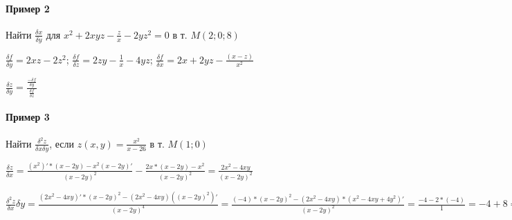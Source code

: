 \documentclass{article}
\begin{document}
\begin{flushleft}
\paragraph{Пример 2}

\hfill

\hfill

Найти $\frac{\delta x}{\delta y}$ для $x^2 + 2xyz - \frac{z}{x} - 2yz^2 = 0$ в т. $M(2; 0; 8)$

$\frac{\delta f}{\delta y} = 2xz - 2z^2$; $\frac{\delta f}{\delta z} = 2zy - \frac{1}{x} - 4yz$; $\frac{\delta f}{\delta x} = 2x + 2yz - \frac{(x - z)}{x^2}$

$\frac{\delta z}{\delta y} = \frac{\frac{- \delta f}{\delta y}}{\frac{\delta f}{\delta z}}$


\paragraph{Пример 3}

\hfill

\hfill

Найти $\frac{\delta^2 z}{\delta x \delta y}$, если $z(x, y) = \frac{x^2}{x - 26}$ в т. $M(1; 0)$

$\frac{\delta z}{\delta x} = \frac{(x^2)' * (x - 2y) - x^2(x - 2y)'}{(x - 2y)^2} - \frac{2x * (x - 2y) - x^2}{(x - 2y)^2} = \frac{2x^2 - 4x y}{(x - 2y)^2}$

$\frac{\delta^2 z}{\delta x}{\delta y} = \frac{(2x^2 - 4xy)' * (x - 2y)^2 - (2x^2 - 4xy)((x - 2y)^2)'}{(x - 2y)^4} = \frac{(-4) * (x - 2y)^2 - (2x^2 - 4xy) * (x^2 - 4x y + 4y^2)'}{(x - 2y)^2} = \frac{-4 - 2 * (-4)}{1} = -4 + 8 = 4$

\end{flushleft}
\end{document}
